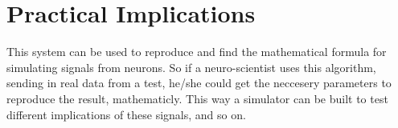 \section{Practical Implications}

This system can be used to reproduce and find the mathematical formula
for simulating signals from neurons. So if a neuro-scientist uses this algorithm, 
sending in real data from a test, he/she could get the neccesery parameters to
reproduce the result, mathematicly. This way a simulator can be built to test 
different implications of these signals, and so on. 
